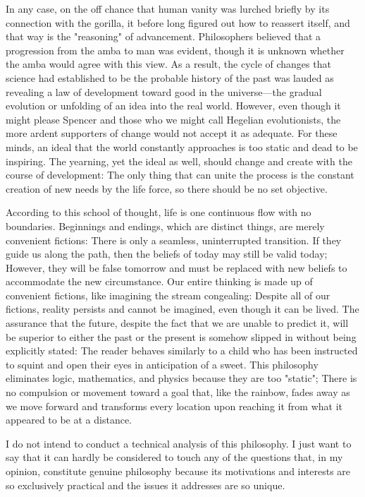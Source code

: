 \documentclass[a4paper,12pt]{book}[2004/02/16]
\theoremstyle{ilemma}
\theoremstyle{itheorem}
\theoremstyle{iother}
\theoremstyle{icorollary}
\theoremstyle{numcorollary}
\theoremstyle{idefinition}
\begin{document}
In any case, on the off chance that human vanity was lurched briefly by its connection with
the gorilla, it before long figured out how to reassert itself, and that way is the
"reasoning" of advancement. Philosophers believed that a progression from the amba to man was evident, though it is unknown whether the amba would agree with this view. As a result, the cycle of changes that science had established to be the probable history of the past was lauded as revealing a law of development toward good in the universe—the gradual evolution or unfolding of an idea into the real world. However, even though it might please Spencer and those who we might call Hegelian evolutionists, the more ardent supporters of change would not accept it as adequate. For these minds, an ideal that the world constantly approaches is too static and dead to be inspiring. The yearning, yet the ideal as well, should change and
create with the course of development: The only thing that can unite the process is the constant creation of new needs by the life force, so there should be no set objective.

According to this school of thought, life is one continuous flow with no boundaries. Beginnings and endings, which are distinct things, are merely convenient fictions: There is only a seamless, uninterrupted transition. If they guide us along the path, then the beliefs of today may still be valid today; However, they will be false tomorrow and must be replaced with new beliefs to accommodate the new circumstance. Our entire thinking is made up of convenient fictions, like imagining the stream congealing:
Despite all of our fictions, reality persists and cannot be imagined, even though it can be lived. The assurance that the future, despite the fact that we are unable to predict it, will be superior to either the past or the present is somehow slipped in without being explicitly stated: The reader behaves similarly to a child who has been instructed to squint and open their eyes in anticipation of a sweet. This philosophy eliminates logic, mathematics, and physics because they are too "static"; There is no compulsion or movement toward a goal that, like the rainbow, fades away as we move forward and transforms every location upon reaching it from what it appeared to be at a distance.

I do not intend to conduct a technical analysis of this philosophy. I just want to say that it can hardly be considered to touch any of the questions that, in my opinion, constitute genuine philosophy because its motivations and interests are so exclusively practical and the issues it addresses are so unique.
\end{document}
